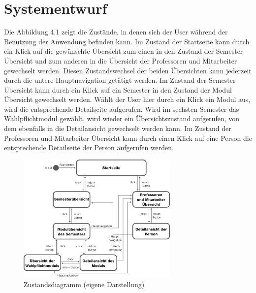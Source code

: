 \documentclass[12pt,					%
							 oneside,			%
							 a4paper,			%
							 halfparskip,		%
							 liststotoc,			%
							 bibtotoc,			%
							 fleqn,				%
							 pointlessnumbers]	%
							 {scrreprt}
\begin{document}
		\section{Systementwurf}
		Die Abbildung 4.1 zeigt die Zustände, in denen sich der User während der Benutzung der Anwendung befinden kann. Im Zustand der Startseite kann durch ein Klick auf die gewünschte Übersicht zum einen in den Zustand der Semester Übersicht und zum anderen in die Übersicht der Professoren und Mitarbeiter gewechselt werden. Diesen Zustandswechsel der beiden Übersichten kann jederzeit durch die untere Hauptnavigation getätigt werden. Im Zustand der Semester Übersicht kann durch ein Klick auf ein Semester in den Zustand der Modul Übersicht gewechselt werden. Wählt der User hier durch ein Klick ein Modul aus, wird die entsprechende Detailseite aufgerufen. Wird im sechsten Semester das Wahlpflichtmodul gewählt, wird wieder ein Übersichtszustand aufgerufen, von dem ebenfalls in die Detailansicht gewechselt werden kann. Im Zustand der Professoren und Mitarbeiter Übersicht kann durch einen Klick auf eine Person die entsprechende Detailseite der Person aufgerufen werden.			
		\begin{figure}[h]
			\centering
			\includegraphics[width=0.7\textwidth]{pictures/zustandsdiagram.png}
			\caption{Zustandsdiagramm (eigene Darstellung)}						
			\label{Zustandsdiagramm}
		\end{figure}
\newpage					
\end{document}
